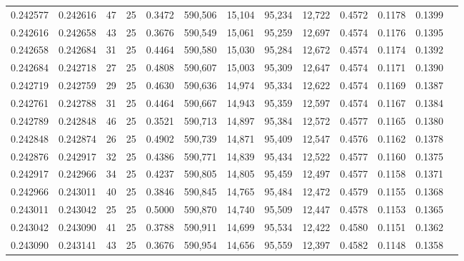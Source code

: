 \begin{tabular}{rrrrrrrrrrrrr}
0.242577 & 0.242616 &    47 &  25 &                                     0.3472 & 590,506 &  15,104 &  95,234 &  12,722 & 0.4572 & 0.1178 & 0.1399 \\
0.242616 & 0.242658 &    43 &  25 &                                     0.3676 & 590,549 &  15,061 &  95,259 &  12,697 & 0.4574 & 0.1176 & 0.1395 \\
0.242658 & 0.242684 &    31 &  25 &                                     0.4464 & 590,580 &  15,030 &  95,284 &  12,672 & 0.4574 & 0.1174 & 0.1392 \\
0.242684 & 0.242718 &    27 &  25 &                                     0.4808 & 590,607 &  15,003 &  95,309 &  12,647 & 0.4574 & 0.1171 & 0.1390 \\
0.242719 & 0.242759 &    29 &  25 &                                     0.4630 & 590,636 &  14,974 &  95,334 &  12,622 & 0.4574 & 0.1169 & 0.1387 \\
0.242761 & 0.242788 &    31 &  25 &                                     0.4464 & 590,667 &  14,943 &  95,359 &  12,597 & 0.4574 & 0.1167 & 0.1384 \\
0.242789 & 0.242848 &    46 &  25 &                                     0.3521 & 590,713 &  14,897 &  95,384 &  12,572 & 0.4577 & 0.1165 & 0.1380 \\
0.242848 & 0.242874 &    26 &  25 &                                     0.4902 & 590,739 &  14,871 &  95,409 &  12,547 & 0.4576 & 0.1162 & 0.1378 \\
0.242876 & 0.242917 &    32 &  25 &                                     0.4386 & 590,771 &  14,839 &  95,434 &  12,522 & 0.4577 & 0.1160 & 0.1375 \\
0.242917 & 0.242966 &    34 &  25 &                                     0.4237 & 590,805 &  14,805 &  95,459 &  12,497 & 0.4577 & 0.1158 & 0.1371 \\
0.242966 & 0.243011 &    40 &  25 &                                     0.3846 & 590,845 &  14,765 &  95,484 &  12,472 & 0.4579 & 0.1155 & 0.1368 \\
0.243011 & 0.243042 &    25 &  25 &                                     0.5000 & 590,870 &  14,740 &  95,509 &  12,447 & 0.4578 & 0.1153 & 0.1365 \\
0.243042 & 0.243090 &    41 &  25 &                                     0.3788 & 590,911 &  14,699 &  95,534 &  12,422 & 0.4580 & 0.1151 & 0.1362 \\
0.243090 & 0.243141 &    43 &  25 &                                     0.3676 & 590,954 &  14,656 &  95,559 &  12,397 & 0.4582 & 0.1148 & 0.1358 \\

\end{tabular}

